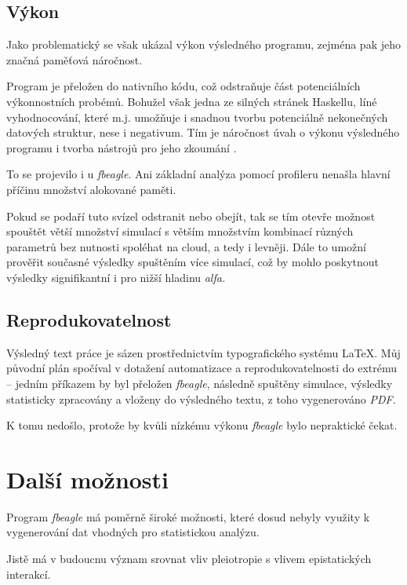 \subsection{Výkon}

Jako problematický se však ukázal výkon výsledného programu, zejména pak jeho značná paměťová náročnost.

Program je přeložen do nativního kódu, což odstraňuje část potenciálních výkonnostních probémů. Bohužel však jedna ze silných stránek
Haskellu, líné vyhodnocování, které m.j. umožňuje i snadnou tvorbu potenciálně nekonečných datových struktur, nese i negativum.
Tím je náročnost úvah o výkonu výsledného programu i tvorba nástrojů pro jeho zkoumání \citep{wadler1998no}.

To se projevilo i u \textit{fbeagle}. Ani základní analýza pomocí profileru nenašla hlavní příčinu množství alokované paměti.

Pokud se podaří tuto svízel odstranit nebo obejít, tak se tím otevře možnost spouštět větší množství simulací s větším množstvím kombinací
různých parametrů bez nutnosti spoléhat na cloud, a tedy i levněji. Dále to umožní prověřit současné výsledky spuštěním více simulací, což by
mohlo poskytnout výsledky signifikantní i pro nižší hladinu \textit{alfa.}

\subsection{Reprodukovatelnost}

Výsledný text práce je sázen prostřednictvím typografického systému \LaTeX. Můj původní plán spočíval v dotažení automatizace a
reprodukovatelnosti do extrému -- jedním příkazem by byl přeložen \textit{fbeagle}, následně spuštěny simulace, výsledky statisticky
zpracovány a vloženy do výsledného textu, z toho vygenerováno \textit{PDF}.

K tomu nedošlo, protože by kvůli nízkému výkonu \textit{fbeagle} bylo nepraktické čekat.

\section{Další možnosti}

Program \textit{fbeagle} má poměrně široké možnosti, které dosud nebyly využity k vygenerování dat vhodných pro statistickou analýzu.

Jistě má v budoucnu význam srovnat vliv pleiotropie s vlivem epistatických interakcí.

